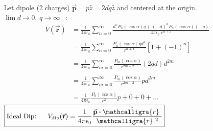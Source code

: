 \documentclass[12pt]{article}
\newcommand{\scripty}[1]{\ensuremath{\mathcalligra{#1}}}
\newcommand{\cursrr}{\scripty{r}\ }
\newcommand{\dotP}{\boldsymbol \cdot}		%
\begin{document}
\vspace{15pt}
\begin{minipage}[t]{0.48\textwidth}
	Let dipole (2 charges) \( \vec{ \mathbf{p} } = p \hat{z} = 2dq \hat{z} \) and centered at the origin. \\[15pt]
	\(\lim d \rightarrow 0, \ q \rightarrow \infty \) \ :
	\begin{align*}
		V( \vec{ \mathbf{r} } ) &= \frac{1}{4 \pi \epsilon_0} \sum_{n=0}^\infty 
			\frac{ d^n P_n (\cos{\alpha}) q+ (-d)^n P_n (\cos{\alpha}) (-q) }{4 \pi \epsilon_0 \ r^{n+1}} \\ \\
		&= \frac{1}{4 \pi \epsilon_0} \sum_{n=0}^\infty \frac{ P_n (\cos{\alpha}) q d^n }{r^{n+1}} [ 1 + (-1)^n ] \\ \\
		&= \frac{1}{4 \pi \epsilon_0} \sum_{m=0}^\infty \frac{ P_m (\cos{\alpha}) }{r^{2m+2}} (2 q d) d^{2m} \\ \\
		&= \frac{1}{4 \pi \epsilon_0} \sum_{m=0}^\infty \frac{ P_m (\cos{\alpha}) }{r^{2m+2}} p d^{2m} \\ \\
		&= \frac{1}{4 \pi \epsilon_0} \frac{ P_0 (\cos{\alpha}) }{r^{2}} p + 0 + 0 + ...
	\end{align*}
	\hfill \break
	\( \boxed{ \text{Ideal Dip:} \ \ \ \ \  V_{ \text{dip} }( \vec{ \mathbf{r} } ) 
		= \frac{1}{4 \pi \epsilon_0} \frac{ \vec{ \mathbf{p} } \dotP \hat{\cursrr} }{\cursrr^{2}} } \)
\end{minipage}
\hfill\vline\hfill
\end{document}
